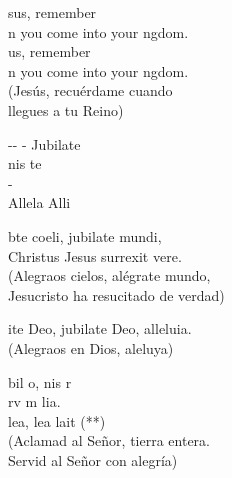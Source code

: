 \documentclass[12pt]{article}
\begin{document}
\begin{multicols*}{2}
\begin{cancion}%
	sus, remember \\
	n you come into your ngdom.\\
	us, remember \\
	n you come into your ngdom.\\
(Jesús, recuérdame cuando \\
 llegues a tu Reino)\\
\end{cancion}%

\begin{cancion}%
	-- -  Jubilate \\
	nis te\\
	  - \\
	Allela Alli\\
\end{cancion}%

\begin{cancion}%
	bte coeli, jubilate mundi,\\
Christus Jesus surrexit vere.\\
(Alegraos cielos, alégrate mundo,\\
 Jesucristo ha resucitado de verdad)\\
\end{cancion}%

\begin{cancion}%
	ite Deo, jubilate Deo, alleluia.\\
(Alegraos en Dios, aleluya)\\
\end{cancion}%

\begin{cancion}%
	bil o, nis r\\
	rv m  lia.\\
	lea, lea  lait (**)\\
(Aclamad al Señor, tierra entera.\\
 Servid al Señor con alegría)\\
\end{cancion}%


\end{multicols*}
\end{document}
